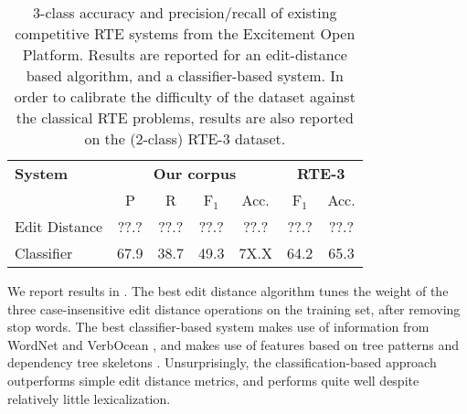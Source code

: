 %
%
\def\t#1{\small{#1}}
\def\b#1{\t{\textbf{#1}}}
\def\colspaceS{2.0mm}
\def\colspaceM{3.0mm}
\def\colspaceL{4.0mm}

\begin{table}
\begin{center}
\begin{tabular}{l@{\hskip \colspaceL}c@{\hskip \colspaceS}c@{\hskip \colspaceS}c@{\hskip \colspaceS}c@{\hskip \colspaceL}c@{\hskip \colspaceS}c}
\hline
\textbf{System} & \multicolumn{4}{c}{\b{Our corpus}} & \multicolumn{2}{c}{\b{RTE-3}} \\
 & \t{P} & \t{R} & \t{F$_1$} & \t{Acc.} & \t{F$_1$} & \t{Acc.} \\
\hline
\t{Edit Distance} & \t{??.?} & \t{??.?} & \t{??.?} & \t{??.?} & 
                    \t{??.?} & \t{??.?} \\
\t{Classifier}    & \t{67.9} & \t{38.7} & \t{49.3} & \t{7X.X} & 
                    \t{64.2} & \t{65.3} \\
\hline
\end{tabular}
\end{center}
\caption{
\label{tab:eopresults}
3-class accuracy and precision/recall of existing competitive RTE
systems from the Excitement Open Platform.
Results are reported for an edit-distance based algorithm, and a
  classifier-based system.
In order to calibrate the difficulty of the dataset against the 
  classical RTE problems, results are also reported on the (2-class) 
  RTE-3 dataset.
}
\end{table}
%
%

We report results in .
The best edit distance algorithm tunes the weight of the three 
  case-insensitive edit distance operations on the training set, 
  after removing stop words.
The best classifier-based system makes use of information from
  WordNet \cite{miller1995wordnet} and VerbOcean
  \cite{chklovski2004verbocean}, and makes use of features
  based on tree patterns and dependency tree skeletons
  \cite{wang2007recognizing}.
Unsurprisingly, the classification-based approach outperforms simple
  edit distance metrics, and performs quite well despite relatively
  little lexicalization.

%
%
